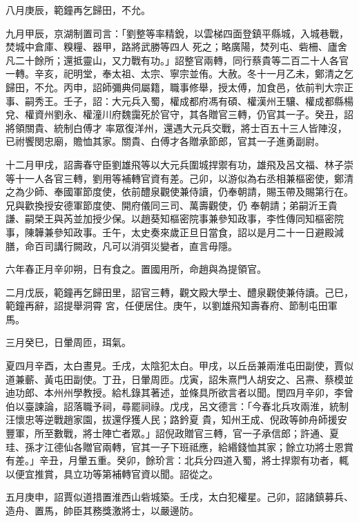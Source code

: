 \begin{pinyinscope}
 八月庚辰，範鐘再乞歸田，不允。



 九月甲辰，京湖制置司言：「劉整等率精銳，以雲梯四面登鎮平縣城，入城巷戰，焚城中倉庫、糗糧、器甲，路將武勝等四人
 死之；略廣陽，焚列屯、砦柵、廬舍凡二十餘所；還抵靈山，又力戰有功。」詔整官兩轉，同行蔡貴等二百二十人各官一轉。辛亥，祀明堂，奉太祖、太宗、寧宗並侑。大赦。冬十一月乙未，鄭清之乞歸田，不允。丙申，詔師彌典伺屬籍，職事修舉，授太傅，加食邑，依前判大宗正事、嗣秀王。壬子，詔：大元兵入蜀，權成都府馮有碩、權漢州王驤、權成都縣楊兌、權資州劉永、權潼川府魏靄死於官守，其各贈官三轉，仍官其一子。癸丑，詔將領關貴、統制白傅才
 率眾復洋州，還遇大元兵交戰，將士百五十三人皆陣沒，已祔饗閔忠廟，贍恤其家。關貴、白傅才各贈承節郎，官其一子進勇副尉。



 十二月甲戌，詔壽春守臣劉雄飛等以大元兵圍城捍禦有功，雄飛及呂文福、林子崇等十一人各官三轉，劉用等補轉官資有差。己卯，以游似為右丞相兼樞密使，鄭清之為少師、奉國軍節度使，依前醴泉觀使兼侍讀，仍奉朝請，賜玉帶及賜第行在。兄與歡換授安德軍節度使、開府儀同三司、萬壽觀使，仍
 奉朝請；弟嗣沂王貴謙、嗣榮王與芮並加授少保。以趙葵知樞密院事兼參知政事，李性傳同知樞密院事，陳韡兼參知政事。壬午，太史奏來歲正旦日當食，詔以是月二十一日避殿減膳，命百司講行闕政，凡可以消弭災變者，直言毋隱。



 六年春正月辛卯朔，日有食之。置國用所，命趙與為提領官。



 二月戊辰，範鐘再乞歸田里，詔官三轉，觀文殿大學士、醴泉觀使兼侍讀。己巳，範鐘再辭，詔提舉洞霄
 宮，任便居住。庚午，以劉雄飛知壽春府、節制屯田軍馬。



 三月癸巳，日暈周匝，珥氣。



 夏四月辛酉，太白晝見。壬戌，太陰犯太白。甲戌，以丘岳兼兩淮屯田副使，賈似道兼蘄、黃屯田副使。丁丑，日暈周匝。戊寅，詔朱熹門人胡安之、呂燾、蔡模並迪功郎、本州州學教授。給札錄其著述，並條具所欲言者以聞。閏四月辛卯，李曾伯以臺諫論，詔落職予祠，尋罷祠祿。戊戌，呂文德言：「今春北兵攻兩淮，統制汪懷忠等逆戰趙家園，拔還俘獲人民；路鈐夏
 貴，知州王成、倪政等帥舟師援安豐軍，所至數戰，將士陣亡者眾。」詔倪政贈官三轉，官一子承信郎；許通、夏珪、孫才江德仙各贈官兩轉，官其一子下班祗應，給緡錢恤其家；餘立功將士恩賞有差。」辛丑，月暈五重。癸卯，餘玠言：北兵分四道入蜀，將士捍禦有功者，輒以便宜推賞，具立功等第補轉官資以聞。詔從之。



 五月庚申，詔賈似道措置淮西山砦城築。壬戌，太白犯權星。己卯，詔諸鎮募兵、造舟、置馬，帥臣其務獎激將士，以嚴邊防。




\end{pinyinscope}

